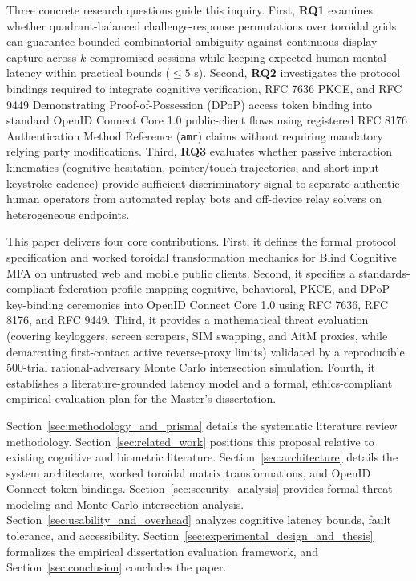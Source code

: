 Three concrete research questions guide this inquiry. First, \textbf{RQ1} examines whether quadrant-balanced challenge-response permutations over toroidal grids can guarantee bounded combinatorial ambiguity against continuous display capture across $k$ compromised sessions while keeping expected human mental latency within practical bounds ($\le 5\text{ s}$). Second, \textbf{RQ2} investigates the protocol bindings required to integrate cognitive verification, RFC 7636 PKCE, and RFC 9449 Demonstrating Proof-of-Possession (DPoP) access token binding into standard OpenID Connect Core 1.0 public-client flows using registered RFC 8176 Authentication Method Reference (\texttt{amr}) claims without requiring mandatory relying party modifications. Third, \textbf{RQ3} evaluates whether passive interaction kinematics (cognitive hesitation, pointer/touch trajectories, and short-input keystroke cadence) provide sufficient discriminatory signal to separate authentic human operators from automated replay bots and off-device relay solvers on heterogeneous endpoints.

This paper delivers four core contributions. First, it defines the formal protocol specification and worked toroidal transformation mechanics for Blind Cognitive MFA on untrusted web and mobile public clients. Second, it specifies a standards-compliant federation profile mapping cognitive, behavioral, PKCE, and DPoP key-binding ceremonies into OpenID Connect Core 1.0 using RFC 7636, RFC 8176, and RFC 9449. Third, it provides a mathematical threat evaluation (covering keyloggers, screen scrapers, SIM swapping, and AitM proxies, while demarcating first-contact active reverse-proxy limits) validated by a reproducible 500-trial rational-adversary Monte Carlo intersection simulation. Fourth, it establishes a literature-grounded latency model and a formal, ethics-compliant empirical evaluation plan for the Master's dissertation.

Section~\ref{sec:methodology_and_prisma} details the systematic literature review methodology. Section~\ref{sec:related_work} positions this proposal relative to existing cognitive and biometric literature. Section~\ref{sec:architecture} details the system architecture, worked toroidal matrix transformations, and OpenID Connect token bindings. Section~\ref{sec:security_analysis} provides formal threat modeling and Monte Carlo intersection analysis. Section~\ref{sec:usability_and_overhead} analyzes cognitive latency bounds, fault tolerance, and accessibility. Section~\ref{sec:experimental_design_and_thesis} formalizes the empirical dissertation evaluation framework, and Section~\ref{sec:conclusion} concludes the paper.
